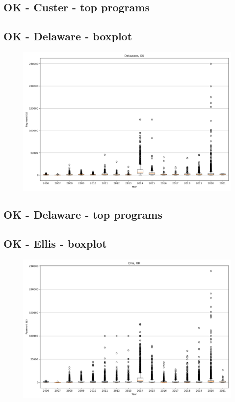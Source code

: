 \subsection*{OK - Custer - top programs}

\newpage
\subsection*{OK - Delaware - boxplot}
\begin{figure}[h]
\centering
\includegraphics[width=7in]{../output/boxplots/counties/Delaware-OK_boxplot.png}
\end{figure}


\subsection*{OK - Delaware - top programs}

\newpage
\subsection*{OK - Ellis - boxplot}
\begin{figure}[h]
\centering
\includegraphics[width=7in]{../output/boxplots/counties/Ellis-OK_boxplot.png}
\end{figure}


